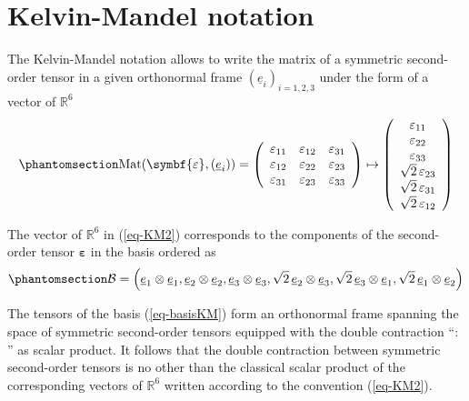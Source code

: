 \documentclass[
  a4paper,
  numbers=noendperiod,
  DIV=12]{scrreprt}
\newcommand{\R}{{\mathbb{{R}}}}
\newcommand{\uu}[1]{{\symbf{{#1}}}}
\newcommand{\uv}[1]{{\underline{{#1}}}}
\newcommand{\ve}[1]{{\uv{{e}}_{{#1}}}}
\newcommand{\eps}{{\uu{{\varepsilon}}}}
\DeclareMathOperator{\Mat}{Mat}
\begin{document}
\section{Kelvin-Mandel notation}\label{sec-KM}

The Kelvin-Mandel notation allows to write the matrix of a symmetric
second-order tensor in a given orthonormal frame
\mbox{$(\ve{i})_{i=1,2,3}$} under the form of a vector of \(\R^6\)
\begin{equation}\phantomsection\label{eq-KM2}{
   \Mat(\eps,(\ve{i}))=
   \left(
   \begin{array}{ccc}
   \varepsilon_{11} & \varepsilon_{12} & \varepsilon_{31}\\
   \varepsilon_{12} & \varepsilon_{22} & \varepsilon_{23}\\
   \varepsilon_{31} & \varepsilon_{23} & \varepsilon_{33}
   \end{array}
   \right)
   \mapsto
   \left(
   \begin{array}{c}
   \varepsilon_{11} \\
   \varepsilon_{22} \\
   \varepsilon_{33} \\
   \sqrt{2}\,\varepsilon_{23} \\
   \sqrt{2}\,\varepsilon_{31} \\
   \sqrt{2}\,\varepsilon_{12}
   \end{array}
   \right)
}\end{equation}

The vector of \(\R^6\) in (\ref{eq-KM2}) corresponds to the components
of the second-order tensor \(\eps\) in the basis ordered as
\begin{equation}\phantomsection\label{eq-basisKM}{
\mathcal{B}=\left(
\ve{1}\otimes\ve{1},
\ve{2}\otimes\ve{2},
\ve{3}\otimes\ve{3},
\sqrt{2}\,\ve{2}\otimes\ve{3},
\sqrt{2}\,\ve{3}\otimes\ve{1},
\sqrt{2}\,\ve{1}\otimes\ve{2}
\right)
}\end{equation}

The tensors of the basis (\ref{eq-basisKM}) form an orthonormal frame
spanning the space of symmetric second-order tensors equipped with the
double contraction ``\(:\)'' as scalar product. It follows that the
double contraction between symmetric second-order tensors is no other
than the classical scalar product of the corresponding vectors of
\(\R^6\) written according to the convention (\ref{eq-KM2}).
\end{document}
